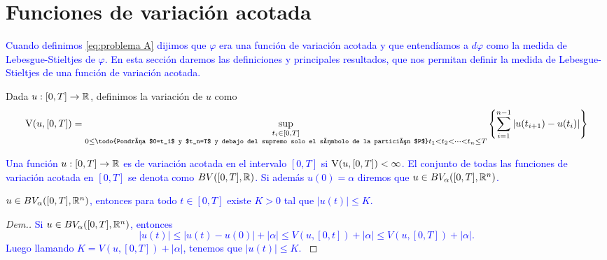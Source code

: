 \section{Funciones de variación acotada}
\textcolor{blue}{Cuando definimos \ref{eq:problema A} dijimos que $\varphi$ era una función de variación acotada y que entendíamos a  $d\varphi$ como la medida de Lebesgue-Stieltjes de $\varphi$. En esta sección daremos las definiciones y principales resultados, que nos permitan definir la medida de Lebesgue-Stieltjes de una función de variación acotada.}

\begin{defi}
	Dada $u:[0,T]\to \mathbb{R}$, definimos la variación  de $u$ como \label{def:variación}
	$$\V(u,[0,T])=\sup_{\substack{ t_i\in [0,T]\\
			0\leq\reversemarginpar \textrm{\todo{Pondría $0=t_1$ y $t_n=T$ y debajo del supremo solo el símbolo de la partición $P$}}t_1 < t_2< \dots < t_n  \leq T}}\left\lbrace \sum_{i=1}^{n-1}|u(t_{i+1})-u(t_i)|\right\rbrace $$
\end{defi}


\begin{defi}
\textcolor{blue}{ Una función $u:[0,T]\to \mathbb{R}$ es de variación acotada en el intervalo $[0,T]$ si $\operatorname{V}(u,[0,T])<\infty$.
	El conjunto de todas las funciones de variación acotada en $[0,T]$ se denota como $BV([0,T],\mathbb{R})$. Si además $u(0)=\alpha$ diremos que $u\in BV_\alpha([0,T],\mathbb{R}^n)$. }
\end{defi}


\begin{lem} \label{lem:var-acotada}
    \textcolor{blue}{ $u\in BV_\alpha([0,T],\mathbb{R}^n)$, entonces para todo $t\in[0,T]$ existe $K>0$ tal que $|u(t)|\leq K$.  }
\end{lem}
\begin{proof}[Dem.]\textcolor{blue}{
Si $u\in BV_\alpha([0,T],\mathbb{R}^n)$, entonces
    \begin{equation}
        |u(t)|\leq |u(t)-u(0)|+|\alpha|\leq V(u,[0,t])+|\alpha|\leq V(u,[0,T])+|\alpha|.
    \end{equation}
Luego llamando $K=V(u,[0,T])+|\alpha|$, tenemos que $|u(t)|\leq K$.  }
    
\end{proof}


